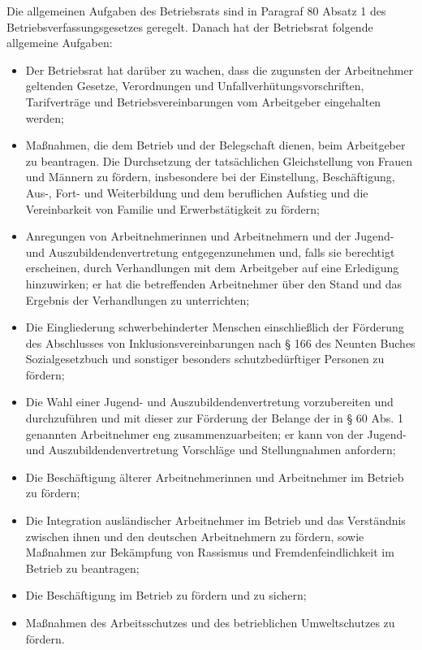 Die allgemeinen Aufgaben des Betriebsrats sind in Paragraf 80 Absatz 1 des Betriebsverfassungsgesetzes geregelt. Danach hat der Betriebsrat folgende allgemeine Aufgaben:
\begin{itemize}
	\item 
	Der Betriebsrat hat darüber zu wachen, dass die zugunsten der Arbeitnehmer geltenden Gesetze, Verordnungen und Unfallverhütungsvorschriften, Tarifverträge und Betriebsvereinbarungen vom Arbeitgeber eingehalten werden;
	\item
	Maßnahmen, die dem Betrieb und der Belegschaft dienen, beim Arbeitgeber zu beantragen. Die Durchsetzung der tatsächlichen Gleichstellung von Frauen und Männern zu fördern, insbesondere bei der Einstellung, Beschäftigung, Aus-, Fort- und Weiterbildung und dem beruflichen Aufstieg und die Vereinbarkeit von Familie und Erwerbstätigkeit zu fördern;
	\item 
	Anregungen von Arbeitnehmerinnen und Arbeitnehmern und der Jugend- und Auszubildendenvertretung entgegenzunehmen und, falls sie berechtigt erscheinen, durch Verhandlungen mit dem Arbeitgeber auf eine Erledigung hinzuwirken; er hat die betreffenden Arbeitnehmer über den Stand und das Ergebnis der Verhandlungen zu unterrichten;
	\item
	Die Eingliederung schwerbehinderter Menschen einschließlich der Förderung des Abschlusses von Inklusionsvereinbarungen nach § 166 des Neunten Buches Sozialgesetzbuch und sonstiger besonders schutzbedürftiger Personen zu fördern;
	\item
	Die Wahl einer Jugend- und Auszubildendenvertretung vorzubereiten und durchzuführen und mit dieser zur Förderung der Belange der in § 60 Abs. 1 genannten Arbeitnehmer eng zusammenzuarbeiten; er kann von der Jugend- und Auszubildendenvertretung Vorschläge und Stellungnahmen anfordern;
	\item
	Die Beschäftigung älterer Arbeitnehmerinnen und Arbeitnehmer im Betrieb zu fördern;
	\item
	Die Integration ausländischer Arbeitnehmer im Betrieb und das Verständnis zwischen ihnen und den deutschen Arbeitnehmern zu fördern, sowie Maßnahmen zur Bekämpfung von Rassismus und Fremdenfeindlichkeit im Betrieb zu beantragen;
	\item
	Die Beschäftigung im Betrieb zu fördern und zu sichern;
	\item
	Maßnahmen des Arbeitsschutzes und des betrieblichen Umweltschutzes zu fördern.
\end{itemize}

